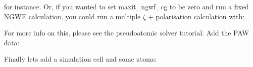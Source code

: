 \documentclass[letterpaper,10pt,english]{sphinxmanual}
\begin{document}
for instance. Or, if you wanted to set maxit\_ngwf\_cg to be zero and
run a fixed NGWF calculation, you could run a multiple \(\zeta\) +
polarisation calculation with:

%
\begin{sphinxVerbatim}[commandchars=\\\{\}]
 
     
 

  
 
 
\end{sphinxVerbatim}

For more info on this, please see the pseudoatomic solver tutorial. Add
the PAW data:

%
\begin{sphinxVerbatim}[commandchars=\\\{\}]
 
 
 
\end{sphinxVerbatim}

Finally lets add a simulation cell and some atoms:
\end{document}

